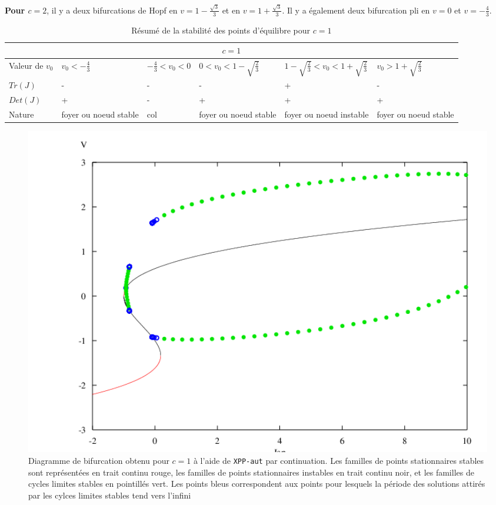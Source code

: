 \documentclass[12pt,a4paper,onecolumn]{article}
\begin{document}
\textbf{Pour $c=2$}, il y a deux bifurcations de Hopf en $v = 1 - \frac{\sqrt{3}}{3}$ et en $v = 1 + \frac{\sqrt{3}}{3}$. Il y a également deux bifurcation pli en $v = 0$ et $v = -\frac{4}{3}$.

\newpage

\begin{table}[H]
\begin{tabular}{|L{2cm} | C{2cm} | C{2.5cm} | C{2.5cm} |C{2.5cm}|C{2.5cm}|}
\hline
{}
\\\hline
Valeur de $v_0$ & $v_0 < - \frac{4}{3}$ & $- \frac{4}{3} < v_0 < 0$ & $0 < v_0 < 1 - \sqrt{\frac{2}{3}}$ & $1 - \sqrt{\frac{2}{3}} < v_0 < 1 + \sqrt{\frac{2}{3}}$ &$v_0 > 1 + \sqrt{\frac{2}{3}}$ \\
 \hline
$Tr(J)$ & - & - & - & + & - \\ \hline
$Det(J)$ & + & - & + & + &+ \\ \hline
Nature & foyer ou noeud stable  & col & foyer ou noeud stable & foyer ou noeud instable & foyer ou noeud stable \\ \hline
\end{tabular}
\caption{Résumé de la stabilité des points d'équilibre pour $c = 1$}
\label{resume_c_2}
\end{table}

\begin{figure}[H]
\begin{center}
\includegraphics[width = 1.0\textwidth]{bif_10.png}
\end{center}
\caption{Diagramme de bifurcation obtenu pour $c=1$ à l'aide de \texttt{XPP-aut} par continuation. Les familles de points stationnaires stables sont représentées en trait continu rouge, les familles de points stationnaires instables en trait continu noir, et les familles de cycles limites stables en pointillés vert. Les points bleus correspondent aux points pour lesquels la période des solutions attirés par les cylces limites stables tend vers l'infini}
\label{fig_res_c_1}
\end{figure}
\end{document}

